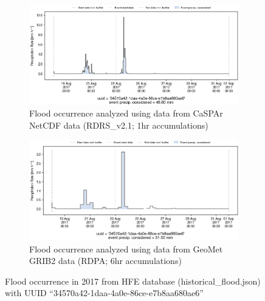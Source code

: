 \documentclass[10pt,a4paper,titlepage,parskip]{scrartcl}
\begin{document}
\begin{figure}[h]
	\begin{subfigure}[a]{1.0\textwidth}
		\centering
		\includegraphics[width=\linewidth]{figures/compare_Geomet_CaSPAr/interpolated_at_stations_occurrence_883_identified-timesteps_RDRS_v2.1.png}
		\caption{Flood occurrence analyzed using data from CaSPAr NetCDF data (RDRS\_v2.1; 1hr accumulations)}
	\end{subfigure}
	\par\bigskip\bigskip
	\begin{subfigure}[b]{1.0\textwidth}
		\centering
		\includegraphics[width=\linewidth]{figures/compare_Geomet_CaSPAr/interpolated_at_stations_occurrence_883_identified-timesteps_rdpa_10km_6f.png}
		\caption{Flood occurrence analyzed using data from GeoMet GRIB2 data (RDPA; 6hr accumulations)}
	\end{subfigure}
	\par\bigskip\bigskip
	\caption{Flood occurrence in 2017 from HFE database (historical\_flood.json) with UUID ``34570a42-1daa-4a0e-86ce-e7b8aa680ae6''}
\end{figure}
\pagebreak
\end{document}
